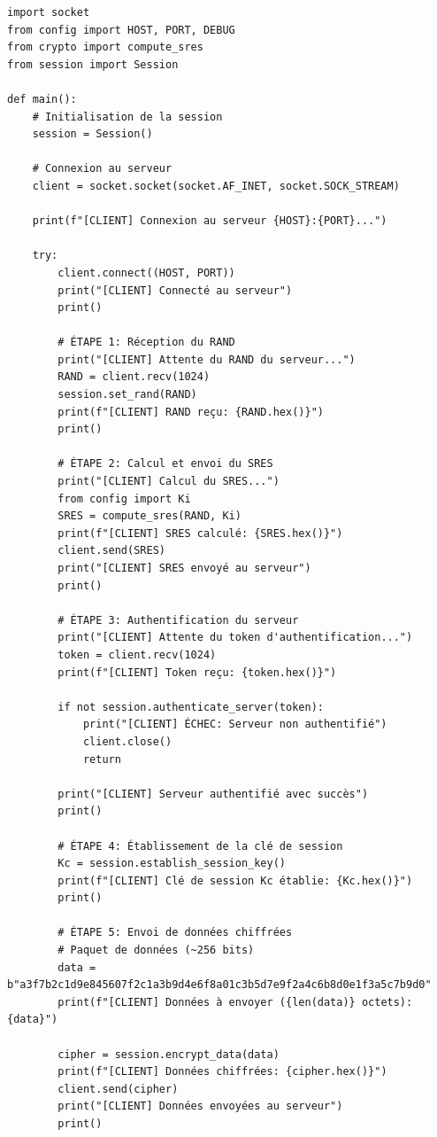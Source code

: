 \documentclass[12pt,a4paper]{report}
\begin{document}
\begin{verbatim}
import socket
from config import HOST, PORT, DEBUG
from crypto import compute_sres
from session import Session

def main():
    # Initialisation de la session
    session = Session()
    
    # Connexion au serveur
    client = socket.socket(socket.AF_INET, socket.SOCK_STREAM)
    
    print(f"[CLIENT] Connexion au serveur {HOST}:{PORT}...")
    
    try:
        client.connect((HOST, PORT))
        print("[CLIENT] Connecté au serveur")
        print()
        
        # ÉTAPE 1: Réception du RAND
        print("[CLIENT] Attente du RAND du serveur...")
        RAND = client.recv(1024)
        session.set_rand(RAND)
        print(f"[CLIENT] RAND reçu: {RAND.hex()}")
        print()
        
        # ÉTAPE 2: Calcul et envoi du SRES
        print("[CLIENT] Calcul du SRES...")
        from config import Ki
        SRES = compute_sres(RAND, Ki)
        print(f"[CLIENT] SRES calculé: {SRES.hex()}")
        client.send(SRES)
        print("[CLIENT] SRES envoyé au serveur")
        print()
        
        # ÉTAPE 3: Authentification du serveur
        print("[CLIENT] Attente du token d'authentification...")
        token = client.recv(1024)
        print(f"[CLIENT] Token reçu: {token.hex()}")
        
        if not session.authenticate_server(token):
            print("[CLIENT] ÉCHEC: Serveur non authentifié")
            client.close()
            return
        
        print("[CLIENT] Serveur authentifié avec succès")
        print()
        
        # ÉTAPE 4: Établissement de la clé de session
        Kc = session.establish_session_key()
        print(f"[CLIENT] Clé de session Kc établie: {Kc.hex()}")
        print()
        
        # ÉTAPE 5: Envoi de données chiffrées
        # Paquet de données (~256 bits)
        data = b"a3f7b2c1d9e845607f2c1a3b9d4e6f8a01c3b5d7e9f2a4c6b8d0e1f3a5c7b9d0"
        print(f"[CLIENT] Données à envoyer ({len(data)} octets): {data}")
        
        cipher = session.encrypt_data(data)
        print(f"[CLIENT] Données chiffrées: {cipher.hex()}")
        client.send(cipher)
        print("[CLIENT] Données envoyées au serveur")
        print()
        

\end{verbatim}
\end{document}
